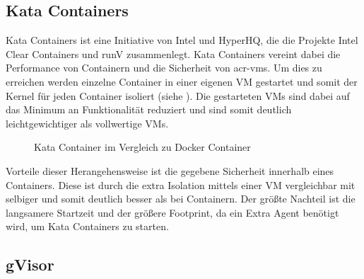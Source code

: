 \subsection{Kata Containers}
\label{sec:compVMbasedKata}

Kata Containers ist eine Initiative von Intel und HyperHQ, die die Projekte Intel Clear Containers und runV zusammenlegt. Kata Containers vereint dabei die Performance von Containern und die Sicherheit von \glspl{acr-vm}. Um dies zu erreichen werden einzelne Container in einer eigenen VM gestartet und somit der Kernel für jeden Container isoliert (siehe ). Die gestarteten VMs sind dabei auf das Minimum an Funktionalität reduziert und sind somit deutlich leichtgewichtiger als vollwertige VMs.

\begin{figure}[h]
	\hfill
	\caption{Kata Container im Vergleich zu Docker Container}
	\label{fig:kataContainers}
\end{figure}

Vorteile dieser Herangehensweise ist die gegebene Sicherheit innerhalb eines Containers. Diese ist durch die extra Isolation mittels einer VM vergleichbar mit selbiger und somit deutlich besser als bei Containern. Der größte Nachteil ist die langsamere Startzeit und der größere Footprint, da ein Extra Agent benötigt wird, um Kata Containers zu starten.

\subsection{gVisor}
\label{sec:compVMbasedGVisor}

